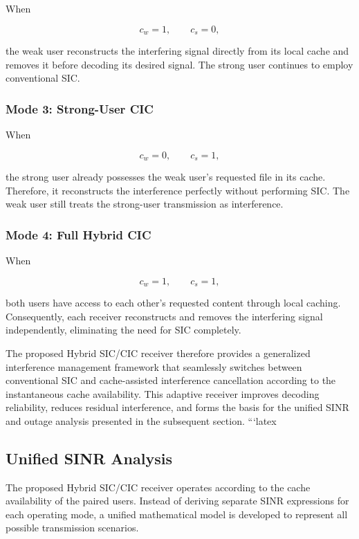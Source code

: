 \documentclass[conference]{IEEEtran}
\begin{document}
When

\[
c_w=1,\qquad c_s=0,
\]

the weak user reconstructs the interfering signal directly from its local cache and removes it before decoding its desired signal. The strong user continues to employ conventional SIC.

\subsubsection*{Mode 3: Strong-User CIC}

When

\[
c_w=0,\qquad c_s=1,
\]

the strong user already possesses the weak user's requested file in its cache. Therefore, it reconstructs the interference perfectly without performing SIC. The weak user still treats the strong-user transmission as interference.

\subsubsection*{Mode 4: Full Hybrid CIC}

When

\[
c_w=1,\qquad c_s=1,
\]

both users have access to each other's requested content through local caching. Consequently, each receiver reconstructs and removes the interfering signal independently, eliminating the need for SIC completely.

The proposed Hybrid SIC/CIC receiver therefore provides a generalized interference management framework that seamlessly switches between conventional SIC and cache-assisted interference cancellation according to the instantaneous cache availability. This adaptive receiver improves decoding reliability, reduces residual interference, and forms the basis for the unified SINR and outage analysis presented in the subsequent section.
```latex
\subsection{Unified SINR Analysis}

The proposed Hybrid SIC/CIC receiver operates according to the cache availability of the paired users. Instead of deriving separate SINR expressions for each operating mode, a unified mathematical model is developed to represent all possible transmission scenarios.
\end{document}
